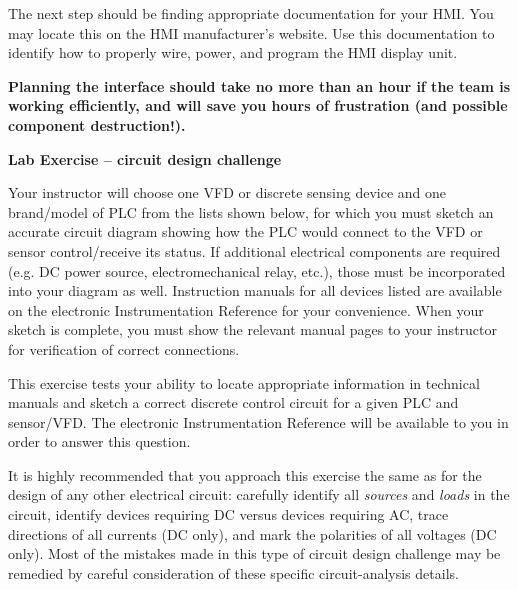 \vskip 10pt

The next step should be finding appropriate documentation for your HMI.  You may locate this on the HMI manufacturer's website.  Use this documentation to identify how to properly wire, power, and program the HMI display unit.

\vskip 10pt

{\bf Planning the interface should take no more than an hour if the team is working efficiently, and will save you hours of frustration (and possible component destruction!).}






\vfil \eject

\noindent
{\bf Lab Exercise -- circuit design challenge}

\vskip 5pt

Your instructor will choose one VFD or discrete sensing device and one brand/model of PLC from the lists shown below, for which you must sketch an accurate circuit diagram showing how the PLC would connect to the VFD or sensor control/receive its status.  If additional electrical components are required (e.g. DC power source, electromechanical relay, etc.), those must be incorporated into your diagram as well.  Instruction manuals for all devices listed are available on the electronic Instrumentation Reference for your convenience.  When your sketch is complete, you must show the relevant manual pages to your instructor for verification of correct connections.

This exercise tests your ability to locate appropriate information in technical manuals and sketch a correct discrete control circuit for a given PLC and sensor/VFD.  The electronic Instrumentation Reference will be available to you in order to answer this question.

\vskip 10pt

It is highly recommended that you approach this exercise the same as for the design of any other electrical circuit: carefully identify all {\it sources} and {\it loads} in the circuit, identify devices requiring DC versus devices requiring AC, trace directions of all currents (DC only), and mark the polarities of all voltages (DC only).  Most of the mistakes made in this type of circuit design challenge may be remedied by careful consideration of these specific circuit-analysis details.



